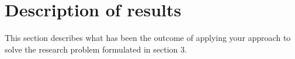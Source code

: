 \chapter{Description of results}
\noindent 
This section describes what has been the outcome of applying your approach to solve the research problem formulated in section 3.

